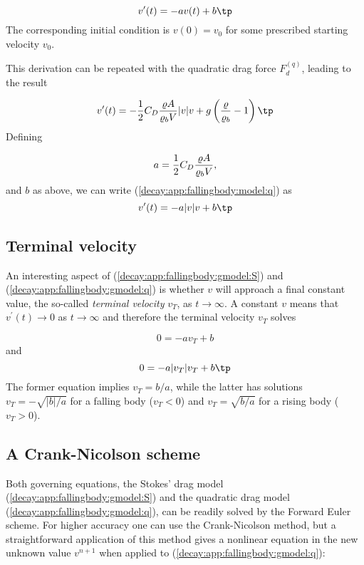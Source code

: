 \documentclass[graybox,sectrefs,envcountresetchap,open=right,final]{svmonodo}
\begin{document}
\begin{equation}
v^{\prime}(t) = -av(t) + b
\label{decay:app:fallingbody:gmodel:S}
\tp
\end{equation}
The corresponding initial condition is $v(0)=v_0$ for some prescribed
starting velocity $v_0$.

This derivation can be repeated with the quadratic drag force
$F_d^{(q)}$, leading to the result

\begin{equation}
v^{\prime}(t) =
-{1\over2}C_D{\varrho A\over\varrho_b V}|v|v +
g\left({\varrho\over\varrho_b} - 1\right)
\tp
\label{decay:app:fallingbody:model:q}
\end{equation}
Defining

\begin{equation}
a = {1\over2}C_D{\varrho A\over\varrho_b V},
\end{equation}
and $b$ as above, we can write (\ref{decay:app:fallingbody:model:q}) as
\begin{equation}
v^{\prime}(t) = -a|v|v + b
\tp
\label{decay:app:fallingbody:gmodel:q}
\end{equation}


\subsection{Terminal velocity}

An interesting aspect of (\ref{decay:app:fallingbody:gmodel:S}) and
(\ref{decay:app:fallingbody:gmodel:q}) is whether $v$ will approach
a final constant value,
the so-called \emph{terminal velocity} $v_T$, as $t\rightarrow\infty$.
A constant $v$ means that
$v^{\prime}(t)\rightarrow 0$ as $t\rightarrow\infty$ and therefore
the terminal velocity $v_T$ solves

\[ 0 = -av_T + b \]
and
\[ 0 = -a|v_T|v_T + b\tp \]
The former equation implies $v_T = b/a$, while the latter has solutions
$v_T =-\sqrt{|b|/a}$ for a falling body ($v_T < 0$) and
$v_T = \sqrt{b/a}$ for a rising body ($v_T>0$).

\subsection{A Crank-Nicolson scheme}

Both governing equations, the Stokes' drag model
(\ref{decay:app:fallingbody:gmodel:S}) and the quadratic drag model
(\ref{decay:app:fallingbody:gmodel:q}), can be readily solved
by the Forward Euler scheme. For higher accuracy one can use
the Crank-Nicolson method, but a straightforward application
of this method gives
a nonlinear equation in the new unknown value $v^{n+1}$ when applied to
(\ref{decay:app:fallingbody:gmodel:q}):
\end{document}
